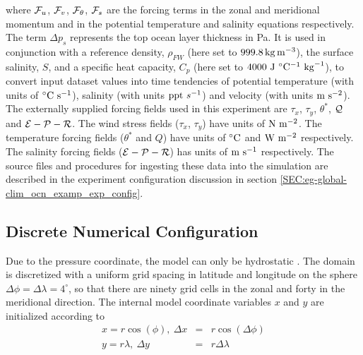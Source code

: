 \noindent where ${\cal F}_{u}$, ${\cal F}_{v}$, ${\cal F}_{\theta}$,
${\cal F}_{s}$ are the forcing terms in the zonal and meridional
momentum and in the potential temperature and salinity equations
respectively.  The term $\Delta p_{s}$ represents the top ocean layer
thickness in Pa.  It is used in conjunction with a reference density,
$\rho_{FW}$ (here set to $999.8\,{\rm kg\,m^{-3}}$), the surface
salinity, $S$, and a specific heat capacity, $C_{p}$ (here set to
$4000~{\rm J}~^{\circ}{\rm C}^{-1}~{\rm kg}^{-1}$), to convert input
dataset values into time tendencies of potential temperature (with
units of $^{\circ}{\rm C}~{\rm s}^{-1}$), salinity (with units ${\rm
  ppt}~s^{-1}$) and velocity (with units ${\rm m}~{\rm s}^{-2}$).  The
externally supplied forcing fields used in this experiment are
$\tau_{x}$, $\tau_{y}$, $\theta^{\ast}$, $\cal{Q}$ and
$\cal{E}-\cal{P}-\cal{R}$. The wind stress fields ($\tau_x$, $\tau_y$)
have units of ${\rm N}~{\rm m}^{-2}$. The temperature forcing fields
($\theta^{\ast}$ and $Q$) have units of $^{\circ}{\rm C}$ and ${\rm
  W}~{\rm m}^{-2}$ respectively. The salinity forcing fields
($\cal{E}-\cal{P}-\cal{R}$) has units of ${\rm m}~{\rm s}^{-1}$
respectively. The source files and procedures for ingesting these data
into the simulation are described in the experiment configuration
discussion in section \ref{SEC:eg-global-clim_ocn_examp_exp_config}.


\subsection{Discrete Numerical Configuration}
\label{www:tutorials}


Due to the pressure coordinate, the model can only be hydrostatic
\cite{szoeke02}. The domain is discretized with a uniform grid
spacing in latitude and longitude on the sphere $\Delta \phi=\Delta
\lambda=4^{\circ}$, so that there are ninety grid cells in the zonal
and forty in the meridional direction.  The internal model coordinate
variables $x$ and $y$ are initialized according to
\begin{eqnarray}
x=r\cos(\phi),~\Delta x & = &r\cos(\Delta \phi) \\
y=r\lambda,~\Delta y &= &r\Delta \lambda 
\end{eqnarray}

